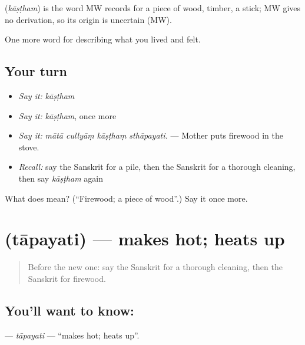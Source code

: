 \begin{cousinweb}
\textbf{} (\emph{kāṣṭham}) is the word MW records for a piece of wood, timber, a stick; MW gives no derivation, so its origin is uncertain (MW).
\end{cousinweb}

\begin{grammarlens}[title={What you've built}]
One more word for describing what you lived and felt.
\end{grammarlens}

\subsection*{Your turn}
\begin{itemize}
\raggedright
  \item \emph{Say it:} \emph{kāṣṭham}
  \item \emph{Say it:} \emph{kāṣṭham}, once more
  \item \emph{Say it:} \emph{mātā cullyāṃ kāṣṭhaṃ sthāpayati.} — Mother puts firewood in the stove.
  \item \emph{Recall:} say the Sanskrit for a pile, then the Sanskrit for a thorough cleaning, then say \emph{kāṣṭham} again
\end{itemize}

\begin{tcolorbox}[breakable,colback=teal!4,colframe=teal!35!black,title={Before you move on}]
What does  mean? (\textquotedblleft{}Firewood; a piece of wood\textquotedblright{}.) Say it once more.
\end{tcolorbox}
\section[\texorpdfstring{\sk{तापयति} (tāpayati)}{तापयति (tāpayati)}]{ (tāpayati) — makes hot; heats up}

\label{lesson:SA-C511-tapayati}



\begin{quote}
Before the new one: say the Sanskrit for a thorough cleaning, then the Sanskrit for firewood.
\end{quote}

\subsection*{You'll want to know: }
\textbf{} — \emph{tāpayati} — \textquotedblleft{}makes hot; heats up\textquotedblright{}.

